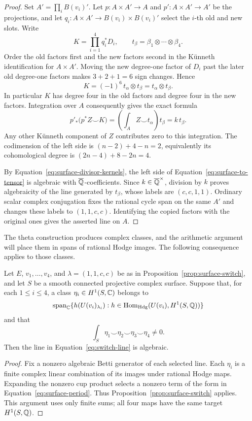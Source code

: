 \begin{proof}
Set \(A'=\prod_iB(v_i)'\).  Let \(p:A\times A'\to A\) and
\(p':A\times A'\to A'\) be the projections, and let
\(q_i:A\times A'\to B(v_i)\times B(v_i)'\) select the \(i\)-th old
and new slots.  Write
\[
 K=\prod_{i=1}^4q_i^*D_i,\qquad
 t_\beta=\beta_1\otimes\cdots\otimes\beta_4.
\]
Order the old factors first and the new factors second in the
Künneth identification for \(A\times A'\).  Moving the new
degree-one factor of \(D_i\) past the later old degree-one factors
makes \(3+2+1=6\) sign changes.  Hence
\[
 K=(-1)^6\,t_\alpha\otimes t_\beta=t_\alpha\otimes t_\beta.
\]
In particular \(K\) has degree four in the old factors and degree
four in the new factors.  Integration over \(A\) consequently gives
the exact formula
\begin{equation}\label{eq:surface-to-tensor}
 p'_*\bigl(p^*Z\smile K\bigr)
   =\left(\int_A Z\smile t_\alpha\right)t_\beta
   =k\,t_\beta.
\end{equation}
Any other Künneth component of \(Z\) contributes zero to this
integration.  The codimension of the left side is
\((n-2)+4-n=2\), equivalently its cohomological degree is
\((2n-4)+8-2n=4\).

By Equation~\eqref{eq:surface-divisor-kernels}, the left side of
Equation~\eqref{eq:surface-to-tensor} is algebraic with
\(\overline{\mathbb{Q}}\)-coefficients.  Since \(k\in\overline{\mathbb{Q}}^\times\), division by \(k\)
proves algebraicity of the line generated by \(t_\beta\), whose
labels are \((c,c,1,1)\).  Ordinary scalar complex conjugation fixes
the rational cycle span on the same \(A'\) and changes these labels
to \((1,1,c,c)\).  Identifying the copied factors with the original
ones gives the asserted line on \(A\).
\end{proof}

The theta construction produces complex classes, and the arithmetic
argument will place them in spans of rational Hodge images.  The
following consequence applies to those classes.

\begin{corollary}
\label{cor:surface-span}
Let \(E\), \(v_1,\ldots,v_4\), and \(\lambda=(1,1,c,c)\) be as in
Proposition~\ref{prop:surface-switch}, and let \(S\) be a smooth
connected projective complex surface.  Suppose that, for each
\(1\leq i\leq4\), a class \(\eta_i\in H^1(S,\mathbb{C})\) belongs to
\[
 \operatorname{span}_{\mathbb{C}}
 \{h(U(v_i)_{\lambda_i}):
       h\in\operatorname{Hom}_{\mathrm{Hdg}}(U(v_i),H^1(S,\mathbb{Q}))\}
\]
and that
\[
 \int_S\eta_1\smile\eta_2\smile\eta_3\smile\eta_4\ne0.
\]
Then the line in Equation~\eqref{eq:switch-line} is algebraic.
\end{corollary}

\begin{proof}
Fix a nonzero algebraic Betti generator of each selected line.
Each \(\eta_i\) is a finite complex linear combination of its images
under rational Hodge maps.  Expanding the nonzero cup product selects
a nonzero term of the form in Equation~\eqref{eq:surface-period}.
Thus Proposition~\ref{prop:surface-switch} applies.  This argument
uses only finite sums; all four maps have the same target
\(H^1(S,\mathbb{Q})\).
\end{proof}
